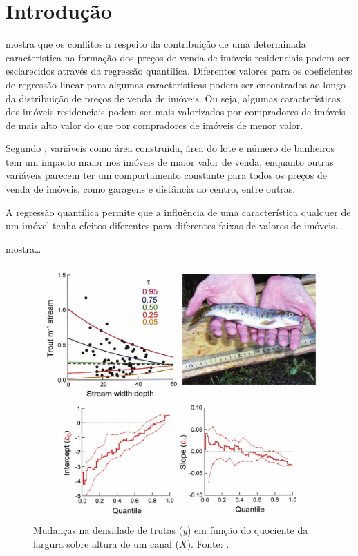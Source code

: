 \documentclass[a4paper, 12pt]{article}
\begin{document}
\hypertarget{introducao}{%
\section{Introdução}\label{introducao}}

\textcite{Zietz} mostra que os conflitos a respeito da contribuição de
uma determinada característica na formação dos preços de venda de
imóveis residenciais podem ser esclarecidos através da regressão
quantílica. Diferentes valores para os coeficientes de regressão linear
para algumas características podem ser encontrados ao longo da
distribuição de preços de venda de imóveis. Ou seja, algumas
características dos imóveis residenciais podem ser mais valorizados por
compradores de imóveis de mais alto valor do que por compradores de
imóveis de menor valor.

Segundo \textcite{Zietz}, variáveis como área construída, área do lote e
número de banheiros tem um impacto maior nos imóveis de maior valor de
venda, enquanto outras variáveis parecem ter um comportamento constante
para todos os preços de venda de imóveis, como garagens e distância ao
centro, entre outras.

A regressão quantílica permite que a influência de uma característica
qualquer de um imóvel tenha efeitos diferentes para diferentes faixas de
valores de imóveis.

\textcite{QReco} mostra\ldots{}

\begin{figure}[H]

{\centering \includegraphics[width=1\linewidth]{images/-000} 

}

\caption{Mudanças na densidade de trutas ($y$) em função do quociente da largura sobre altura de um canal ($X$). Fonte: \textcite{QReco}.}\label{fig:trutas}
\end{figure}
\end{document}
